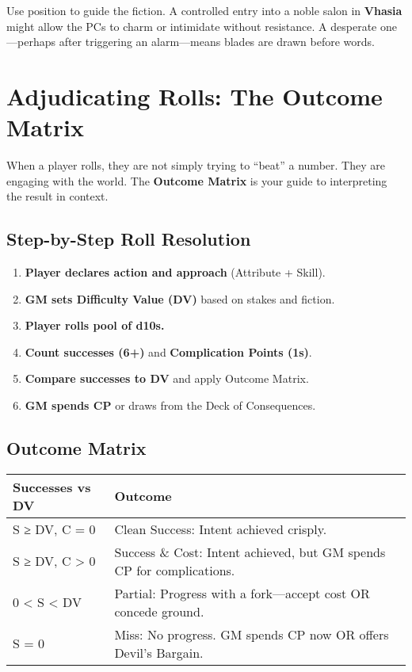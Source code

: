 Use position to guide the fiction. A controlled entry into a noble salon in \textbf{Vhasia} might allow the PCs to charm or intimidate without resistance. A desperate one—perhaps after triggering an alarm—means blades are drawn before words.

\section*{Adjudicating Rolls: The Outcome Matrix}

When a player rolls, they are not simply trying to “beat” a number. They are engaging with the world. The \textbf{Outcome Matrix} is your guide to interpreting the result in context.

\subsection*{Step-by-Step Roll Resolution}

\begin{enumerate}
    \item \textbf{Player declares action and approach} (Attribute + Skill).
    \item \textbf{GM sets Difficulty Value (DV)} based on stakes and fiction.
    \item \textbf{Player rolls pool of d10s.}
    \item \textbf{Count successes (6+)} and \textbf{Complication Points (1s)}.
    \item \textbf{Compare successes to DV} and apply Outcome Matrix.
    \item \textbf{GM spends CP} or draws from the Deck of Consequences.
\end{enumerate}

\subsection*{Outcome Matrix}

\begin{tabular}{|l|l|}
\hline
\textbf{Successes vs DV} & \textbf{Outcome} \\
\hline
S ≥ DV, C = 0 & Clean Success: Intent achieved crisply. \\
S ≥ DV, C > 0 & Success \& Cost: Intent achieved, but GM spends CP for complications. \\
0 < S < DV & Partial: Progress with a fork—accept cost OR concede ground. \\
S = 0 & Miss: No progress. GM spends CP now OR offers Devil’s Bargain. \\
\hline
\end{tabular}


